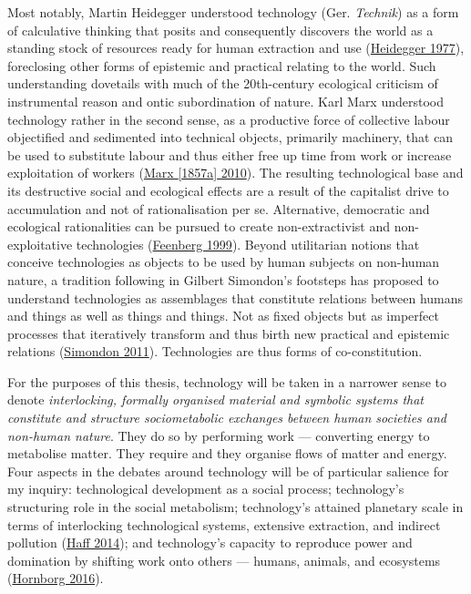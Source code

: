 \documentclass[a4paper, nobind]{templates/ociamthesis}
\begin{document}
Most notably, Martin Heidegger understood technology (Ger. \emph{Technik}) as a form of calculative thinking that posits and consequently discovers the world as a standing stock of resources ready for human extraction and use (\protect\hyperlink{ref-heidegger_question_1977}{Heidegger 1977}), foreclosing other forms of epistemic and practical relating to the world. Such understanding dovetails with much of the 20th-century ecological criticism of instrumental reason and ontic subordination of nature. Karl Marx understood technology rather in the second sense, as a productive force of collective labour objectified and sedimented into technical objects, primarily machinery, that can be used to substitute labour and thus either free up time from work or increase exploitation of workers (\protect\hyperlink{ref-marx_economic_1857a}{Marx {[}1857a{]} 2010}). The resulting technological base and its destructive social and ecological effects are a result of the capitalist drive to accumulation and not of rationalisation per se. Alternative, democratic and ecological rationalities can be pursued to create non-extractivist and non-exploitative technologies (\protect\hyperlink{ref-feenberg_questioning_1999}{Feenberg 1999}). Beyond utilitarian notions that conceive technologies as objects to be used by human subjects on non-human nature, a tradition following in Gilbert Simondon's footsteps has proposed to understand technologies as assemblages that constitute relations between humans and things as well as things and things. Not as fixed objects but as imperfect processes that iteratively transform and thus birth new practical and epistemic relations (\protect\hyperlink{ref-simondon_mode_2011}{Simondon 2011}). Technologies are thus forms of co-constitution.

For the purposes of this thesis, technology will be taken in a narrower sense to denote \emph{interlocking, formally organised material and symbolic systems that constitute and structure sociometabolic exchanges between human societies and non-human nature}. They do so by performing work --- converting energy to metabolise matter. They require and they organise flows of matter and energy. Four aspects in the debates around technology will be of particular salience for my inquiry: technological development as a social process; technology's structuring role in the social metabolism; technology's attained planetary scale in terms of interlocking technological systems, extensive extraction, and indirect pollution (\protect\hyperlink{ref-haff_technology_2014}{Haff 2014}); and technology's capacity to reproduce power and domination by shifting work onto others --- humans, animals, and ecosystems (\protect\hyperlink{ref-hornborg_global_2016}{Hornborg 2016}).
\end{document}
